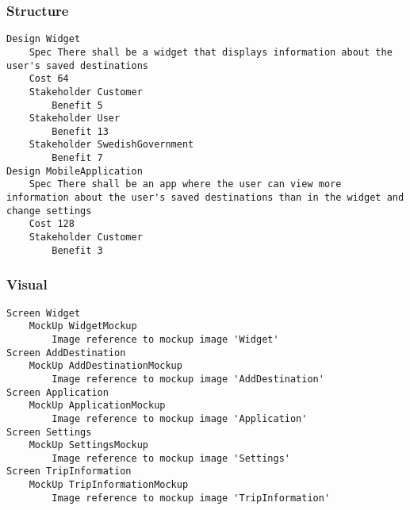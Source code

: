 \begin{lstlisting}

\end{lstlisting}


			 \subsubsection{Structure}


\begin{lstlisting}
Design Widget
	Spec There shall be a widget that displays information about the user's saved destinations
	Cost 64
	Stakeholder Customer
		Benefit 5
	Stakeholder User
		Benefit 13
	Stakeholder SwedishGovernment
		Benefit 7
Design MobileApplication
	Spec There shall be an app where the user can view more information about the user's saved destinations than in the widget and change settings
	Cost 128
	Stakeholder Customer
		Benefit 3

\end{lstlisting}
		
				
			 \subsubsection{Visual}


\begin{lstlisting}
Screen Widget
	MockUp WidgetMockup
		Image reference to mockup image 'Widget'
Screen AddDestination
	MockUp AddDestinationMockup
		Image reference to mockup image 'AddDestination'
Screen Application
	MockUp ApplicationMockup
		Image reference to mockup image 'Application'
Screen Settings
	MockUp SettingsMockup
		Image reference to mockup image 'Settings'
Screen TripInformation
	MockUp TripInformationMockup
		Image reference to mockup image 'TripInformation'

\end{lstlisting}